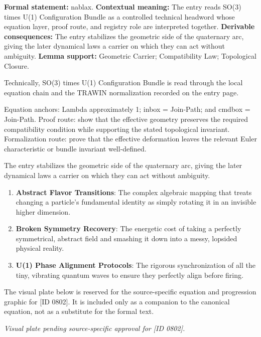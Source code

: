 \begingroup\footnotesize\setlength{\emergencystretch}{3em}\sloppy
\textbf{Formal statement:} nablax. \textbf{Contextual meaning:} The entry reads SO(3) times U(1) Configuration Bundle as a controlled technical headword whose equation layer, proof route, and registry role are interpreted together. \textbf{Derivable consequences:} The entry stabilizes the geometric side of the quaternary arc, giving the later dynamical laws a carrier on which they can act without ambiguity. \textbf{Lemma support:} Geometric Carrier; Compatibility Law; Topological Closure.\par
\endgroup

Technically, SO(3) times U(1) Configuration Bundle is read through the local equation chain and the TRAWIN normalization recorded on the entry page.

Equation anchors: Lambda approximately 1; inbox = Join-Path; and cmdbox = Join-Path. Proof route: show that the effective geometry preserves the required compatibility condition while supporting the stated topological invariant. Formalization route: prove that the effective deformation leaves the relevant Euler characteristic or bundle invariant well-defined.

The entry stabilizes the geometric side of the quaternary arc, giving the later dynamical laws a carrier on which they can act without ambiguity.
\endgroup

\begin{enumerate}[leftmargin=1.6em,itemsep=6pt,topsep=4pt]
\item \textbf{Abstract Flavor Transitions}: The complex algebraic mapping that treats changing a particle's fundamental identity as simply rotating it in an invisible higher dimension.
\item \textbf{Broken Symmetry Recovery}: The energetic cost of taking a perfectly symmetrical, abstract field and smashing it down into a messy, lopsided physical reality.
\item \textbf{U(1) Phase Alignment Protocols}: The rigorous synchronization of all the tiny, vibrating quantum waves to ensure they perfectly align before firing.
\end{enumerate}

\begingroup\footnotesize\sloppy
The visual plate below is reserved for the source-specific equation and progression graphic for [ID 0802]. It is included only as a companion to the canonical equation, not as a substitute for the formal text.
\par\endgroup
\begingroup\footnotesize\itshape
Visual plate pending source-specific approval for [ID 0802].
\par\endgroup

